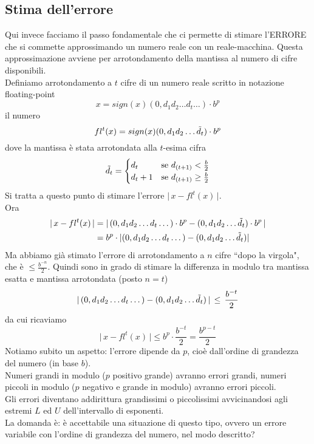 \subsection{Stima dell'errore}
Qui invece facciamo il passo fondamentale che ci permette di stimare l'ERRORE che si commette approssimando un numero reale con un reale-macchina. Questa approssimazione avviene per arrotondamento della mantissa al numero di cifre disponibili. \\
Definiamo arrotondamento a $t$ cifre di un numero reale scritto in notazione floating-point \[ x = sign(x)(0,d_1 d_2 \dotsc d_t \dotsc) \cdot b^p \]
il numero \[ fl^t(x) = sign(x)(0,d_1 d_2 \dotsc \Tilde{d}_t) \cdot b^p \]
dove la mantissa è stata arrotondata alla $t$-esima cifra
\[\Tilde{d}_t = 
\begin{cases}
    d_t & \text{se $d_{(t+1)} < \frac{b}{2}$} \\
    d_t+1 & \text{se $d_{(t+1)} \ge \frac{b}{2}$}
\end{cases}
\]
Si tratta a questo punto di stimare l'errore $\lvert \, x - fl^t(x) \, \rvert$.\\
Ora
\[ \begin{split}
    \lvert \, x - fl^t(x) \, \rvert & = \lvert \, (0,d_1 d_2 \dotsc d_t \dotsc) \cdot b^p - (0,d_1 d_2 \dotsc \Tilde{d}_t) \cdot b^p \, \rvert \\
    & = b^p \cdot \lvert (0,d_1 d_2 \dotsc d_t \dotsc) - (0,d_1 d_2 \dotsc \Tilde{d}_t) \rvert
    \end{split}\]
Ma abbiamo già stimato l'errore di arrotondamento a $n$ cifre ``dopo la virgola", che è $\le \frac{b^{-n}}{2}$. Quindi sono in grado di stimare la differenza in modulo tra mantissa esatta e mantissa arrotondata (posto $n = t$)
\[ \lvert \, (0,d_1 d_2 \dotsc d_t \dotsc) - (0,d_1 d_2 \dotsc \Tilde{d}_t) \, \rvert \, \le \, \frac{b^{-t}}{2} \] da cui ricaviamo
\[ \lvert \, x - fl^t(x) \, \rvert \le b^p \cdot \frac{b^{-t}}{2} = \frac{b^{p-t}}{2} \]
Notiamo subito un aspetto: l'errore dipende da $p$, cioè dall'ordine di grandezza del numero (in base $b$).\\
Numeri grandi in modulo ($p$ positivo grande) avranno errori grandi, numeri piccoli in modulo ($p$ negativo e grande in modulo) avranno errori piccoli. \\
Gli errori diventano addirittura grandissimi o piccolissimi avvicinandosi agli estremi $L$ ed $U$ dell'intervallo di esponenti. \\
La domanda è: è accettabile una situazione di questo tipo, ovvero un errore variabile con l'ordine di grandezza del numero, nel modo descritto? \\

